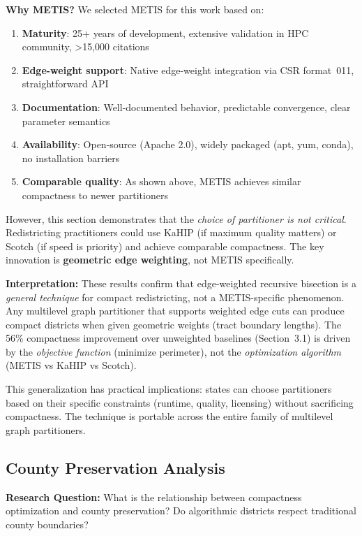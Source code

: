 \textbf{Why METIS?} We selected METIS for this work based on:
\begin{enumerate}
    \item \textbf{Maturity}: 25+ years of development, extensive validation in HPC community, >15,000 citations
    \item \textbf{Edge-weight support}: Native edge-weight integration via CSR format~011, straightforward API
    \item \textbf{Documentation}: Well-documented behavior, predictable convergence, clear parameter semantics
    \item \textbf{Availability}: Open-source (Apache 2.0), widely packaged (apt, yum, conda), no installation barriers
    \item \textbf{Comparable quality}: As shown above, METIS achieves similar compactness to newer partitioners
\end{enumerate}

However, this section demonstrates that the \textit{choice of partitioner is not critical}. Redistricting practitioners could use KaHIP (if maximum quality matters) or Scotch (if speed is priority) and achieve comparable compactness. The key innovation is \textbf{geometric edge weighting}, not METIS specifically.

\textbf{Interpretation:} These results confirm that edge-weighted recursive bisection is a \textit{general technique} for compact redistricting, not a METIS-specific phenomenon. Any multilevel graph partitioner that supports weighted edge cuts can produce compact districts when given geometric weights (tract boundary lengths). The 56\% compactness improvement over unweighted baselines (Section~3.1) is driven by the \textit{objective function} (minimize perimeter), not the \textit{optimization algorithm} (METIS vs KaHIP vs Scotch).

This generalization has practical implications: states can choose partitioners based on their specific constraints (runtime, quality, licensing) without sacrificing compactness. The technique is portable across the entire family of multilevel graph partitioners.

\subsection{County Preservation Analysis}

\textbf{Research Question:} What is the relationship between compactness optimization and county preservation? Do algorithmic districts respect traditional county boundaries?

